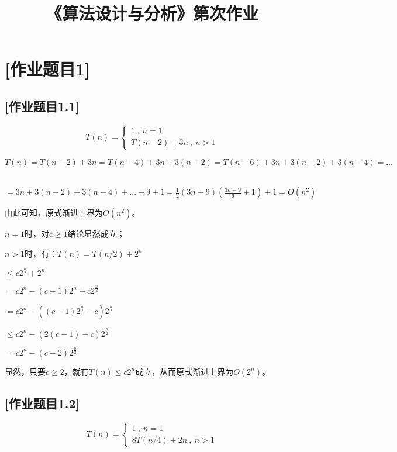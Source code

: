 \documentclass{article}
\title{\heiti \myCollege《算法设计与分析》第\myHomeworkId 次作业} %
\author{\myCollege \quad \myId \quad \myName} %
\begin{document}
\maketitle

\section{[作业题目1]} %

\subsection{[作业题目1.1]} %


$$
T(n)=\left\{
\begin{array}{l}
1\ ,\ n=1\\
T(n-2)+3n\ ,\ n>1
\end{array}
\right.
$$

$T(n)=T(n-2)+3n=T(n-4)+3n+3(n-2)=T(n-6)+3n+3(n-2)+3(n-4)=...$

\qquad\ $=3n+3(n-2)+3(n-4)+...+9+1=\frac{1}{2}(3n+9)(\frac{3n-9}{6}+1)+1=O(n^2)$

由此可知，原式渐进上界为$O(n^2)$。



\qquad$n=1$时，对$c\ge1$结论显然成立；

\qquad$n>1$时，有：$T(n)=T(n/2)+2^n$

\qquad\qquad\qquad\qquad\qquad\quad$\le{c}2^\frac{n}{2}+2^n$

\qquad\qquad\qquad\qquad\qquad\quad$=c2^n-(c-1)2^n+c2^\frac{n}{2}$

\qquad\qquad\qquad\qquad\qquad\quad$=c2^n-((c-1)2^\frac{n}{2}-c)2^\frac{n}{2}$

\qquad\qquad\qquad\qquad\qquad\quad$\le{c}2^n-(2(c-1)-c)2^\frac{n}{2}$

\qquad\qquad\qquad\qquad\qquad\quad$=c2^n-(c-2)2^\frac{n}{2}$

显然，只要$c\ge2$，就有$T(n)\le{c2^n}$成立，从而原式渐进上界为$O(2^n)$。

\subsection{[作业题目1.2]} %

$$
T(n)=\left\{
\begin{array}{l}
1\ ,\ n=1\\
8T(n/4)+2n\ ,\ n>1
\end{array}
\right.
$$
\end{document}
